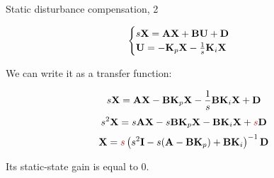 \documentclass{beamer}
\begin{document}
\begin{frame}{Static disturbance compensation, 2}
	\begin{flushleft}
		
		\begin{equation}
			\begin{cases}
				s \mathbf{X} = \mathbf{A} \mathbf{X} + \mathbf{B} \mathbf{U} + \mathbf{D} \\
				\mathbf{U} = -\mathbf{K}_p\mathbf{X} -\frac{1}{s}\mathbf{K}_i \mathbf{X}
			\end{cases}
		\end{equation}
		
		We can write it as a transfer function:
		
		\begin{equation}
				s \mathbf{X} = \mathbf{A} \mathbf{X} -\mathbf{B}\mathbf{K}_p\mathbf{X} -\frac{1}{s}\mathbf{B}\mathbf{K}_i \mathbf{X} + \mathbf{D}
		\end{equation}
		\begin{equation}
		s^2 \bo{X} = s\bo{A} \bo{X} -s\bo{B}\bo{K}_p\bo{X} -\bo{B}\bo{K}_i \bo{X} + \textcolor{mydarkred}{s} \bo{D}
		\end{equation}
		\begin{equation}
		 \bo{X} = \textcolor{mydarkred}{s}
		  \left(
		 s^2 \bo{I} - s(\bo{A} - \bo{B}\bo{K}_p) + \bo{B}\bo{K}_i 
		 \right)^{-1}
		 \bo{D}
		\end{equation}
		
		Its static-state gain is equal to 0.
		
		
	\end{flushleft}
\end{frame}
\end{document}
